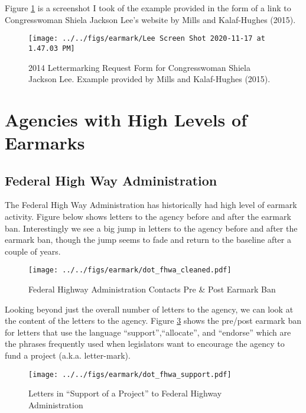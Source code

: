 \documentclass{article}
\begin{document}
Figure \ref{f:leeform} is a screenshot I took of the example provided in the form of a link to Congresswoman Shiela Jackson Lee's website by Mills and Kalaf-Hughes (2015).  


\begin{figure}[ht!]
\caption{2014 Lettermarking Request Form for Congresswoman Shiela Jackson Lee. Example provided by Mills and Kalaf-Hughes (2015). }\label{f:leeform}
\centering
\texttt{[image: ../../figs/earmark/Lee Screen Shot 2020-11-17 at 1.47.03 PM]}
\end{figure}







\clearpage
\section{Agencies with High Levels of Earmarks}
\subsection{Federal High Way Administration}
The Federal High Way Administration has historically had high level of earmark activity.  Figure \label{f:highwayyear}below shows letters to the agency before and after the earmark ban.  Interestingly we see a big jump in letters to the agency before and after the earmark ban, though the jump seems to fade and return to the baseline after a couple of years. 

\begin{figure}[ht!]
\caption{Federal Highway Administration Contacts Pre \& Post Earmark Ban}\label{f:highwayyear}
\centering
\texttt{[image: ../../figs/earmark/dot\_fhwa\_cleaned.pdf]}
\end{figure}

\clearpage

Looking beyond just the overall number of letters to the agency, we can look at the content of the letters to the agency. Figure \ref{f:highwaysupport} shows the pre/post earmark ban for letters that use the language ``support'',``allocate'', and ``endorse'' which are the phrases frequently used when legislators want to encourage the agency to fund a project (a.k.a. letter-mark). 

\begin{figure}[ht!]
\caption{Letters in ``Support of a Project'' to Federal Highway Administration}\label{f:highwaysupport}
\centering
\texttt{[image: ../../figs/earmark/dot\_fhwa\_support.pdf]}
\end{figure}
\end{document}

